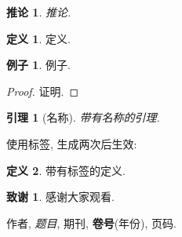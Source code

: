 \documentclass[a4paper, 11pt, UTF8]{article}
\theoremstyle{plain}
\newtheorem{lem}{引理}[section]
\newtheorem{cor}{推论}[section]
\theoremstyle{definition}
\newtheorem{defn}{定义}[section]
\newtheorem{exmp}{例子}[section]
\newtheorem*{ack}{致谢}
\theoremstyle{remark}
\begin{document}
	\begin{cor}
		推论.
	\end{cor}

	\begin{defn}
		定义.
	\end{defn}

	\begin{exmp}
		例子.
	\end{exmp}

	\begin{proof}
		证明.
	\end{proof}

	\begin{lem}[名称]
		带有名称的引理.
	\end{lem}

	使用标签, 生成两次后生效:
	\begin{defn}\label{D3.2}
		带有标签的定义.
	\end{defn}

	\begin{ack}
		感谢大家观看.
	\end{ack}

	
	
	\begin{thebibliography}{60}
		 作者, \emph{题目}, 期刊, \textbf{卷号}(年份), 页码.
	\end{thebibliography}
	
\end{document}
